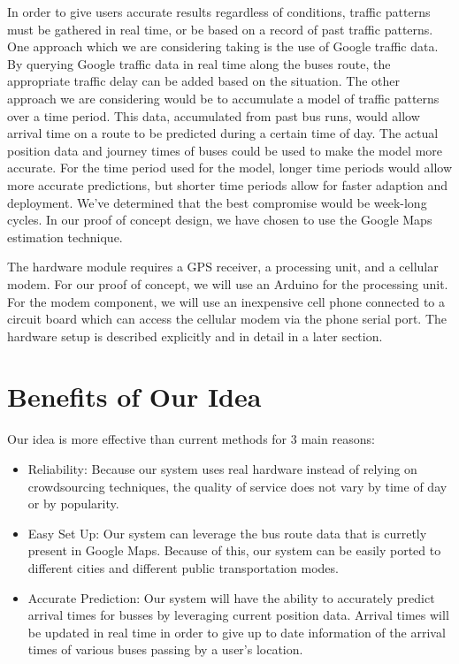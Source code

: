 \documentclass[pageno]{jpaper}
\begin{document}
In order to give users accurate results regardless of conditions, traffic patterns
must be gathered in real time, or be based on a record of past traffic patterns.
One approach which we are considering taking is the use of Google traffic data.
By querying Google traffic data in real time along the buses route, the
appropriate traffic delay can be added based on the situation. The other approach
we are considering would be to accumulate a model of traffic patterns over a 
time period. This data, accumulated from past bus runs, would allow arrival time
on a route to be predicted during a certain time of day. The actual position
data and journey times of buses could be used to make the model more accurate. 
For the time period used for the model, longer time periods would allow more 
accurate predictions, but shorter time periods allow for faster adaption and 
deployment. We've determined that the best compromise would be week-long cycles.
In our proof of concept design, we have chosen to use the Google Maps estimation 
technique.

The hardware module requires a GPS receiver, a processing unit, and a
cellular modem. For our proof of concept, we will use an Arduino for the
processing unit. For the modem component, we will use an inexpensive cell
phone connected to a circuit board which can access the cellular modem
via the phone serial port.  The hardware setup is described explicitly and 
in detail in a later section.

\section{Benefits of Our Idea}

Our idea is more effective than current methods for 3 main reasons:
\begin{itemize}
\item Reliability: Because our system uses real hardware instead of 
        relying on crowdsourcing techniques, the quality of service
        does not vary by time of day or by popularity.
\item Easy Set Up: Our system can leverage the bus route data that 
        is curretly present in Google Maps.  Because of this, 
        our system can be easily ported to different cities 
        and different public transportation modes.
\item Accurate Prediction:  Our system will have the ability to 
        accurately predict arrival times for busses by leveraging 
        current position data. Arrival times will be updated 
        in real time in order to give up to date information of 
        the arrival times of various buses passing by a user's 
        location.
\end{itemize}
\end{document}
